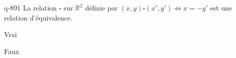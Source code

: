 \begin{truefalse}{q-891}
La relation $\square$ sur $\mathbb R^2$ définie par $(x,y)\square (x',y') \iff x=-y'$ est une relation d'équivalence.
\item Vrai
\item* Faux
\end{truefalse}


